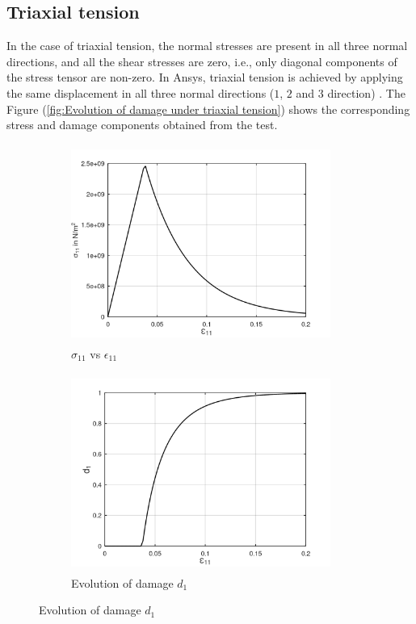 \documentclass[12pt,a4paper,twoside,openright]{report}
\begin{document}
\subsection{Triaxial tension}
\indent\indent\indent In the case of triaxial tension, the normal stresses are present in all three normal directions, and all the shear stresses are zero, i.e., only diagonal components of the stress tensor are non-zero.  In Ansys, triaxial tension is achieved by applying the same displacement in all three normal directions ($1$, $2$ and $3$ direction) \citep{ubt}. The Figure (\ref{fig:Evolution of damage under triaxial tension}) shows the corresponding stress and damage components obtained from the test.\\

\begin{figure}[htbp!]
       \captionsetup[subfigure]{justification=centering}
     \begin{subfigure}{0.4\textwidth}
         \includegraphics[width=8.5cm,height=6.5cm]{24.S11vsE11.png}
         \caption{$\sigma_{11}$ vs $\epsilon_{11}$}
         \label{fig:S11vsE11 2}
     \end{subfigure}
     \hspace{1.5cm}
     \captionsetup[subfigure]{justification=centering}
     \begin{subfigure}{0.4\textwidth}
         \includegraphics[width=8.5cm,height=6.5cm]{24.d1.png}
         \caption{Evolution of damage $d_{1}$}
         \label{fig:Evolution of damage d1 2}
     \end{subfigure}
\end{figure}
\end{document}
